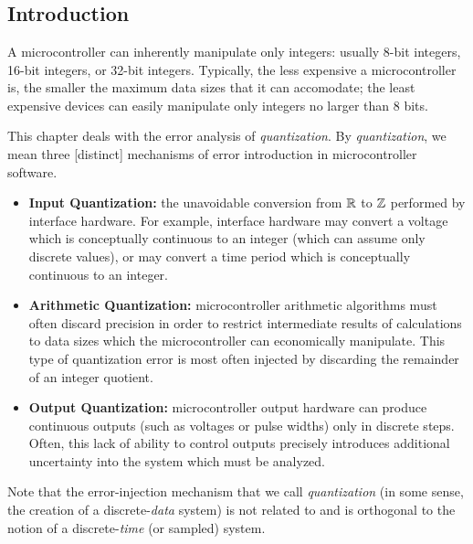 \chapter{\cquazerolongtitle{}}

\label{cqua0}

\section{Introduction}

A microcontroller can inherently manipulate only integers:  usually 8-bit
integers, 16-bit integers, or 32-bit integers.  Typically, the less
expensive a microcontroller is, the smaller the maximum data sizes that
it can accomodate; the least expensive devices can easily manipulate
only integers no larger than 8 bits.

This chapter deals with the error analysis of \emph{quantization}.  By
\emph{quantization}, we mean three [distinct] mechanisms of error introduction
in microcontroller software.

\begin{itemize}
\item \textbf{Input Quantization:} the unavoidable conversion from
      ${\mathbb{R}}$ to ${\mathbb{Z}}$ performed by interface hardware.
      For example, interface hardware may convert a voltage which is
      conceptually continuous to an integer (which can assume only discrete
      values), or may convert a time period which is conceptually
      continuous to an integer.
\item \textbf{Arithmetic Quantization:} microcontroller arithmetic algorithms
      must often discard precision in order to restrict intermediate results of
      calculations to data sizes which the microcontroller can economically
      manipulate.  This type of quantization error is most often injected
      by discarding the remainder of an integer quotient.
\item \textbf{Output Quantization:} microcontroller output hardware can
      produce continuous outputs (such as voltages or pulse widths)
      only in discrete steps.  Often, this lack of ability to control
      outputs precisely introduces additional uncertainty into the
      system which must be analyzed.
\end{itemize}

Note that the error-injection mechanism that we call \emph{quantization}
(in some sense, the creation of a discrete-\emph{data} system)
is not related to and is orthogonal to the notion of a
discrete-\emph{time} (or sampled) system.


